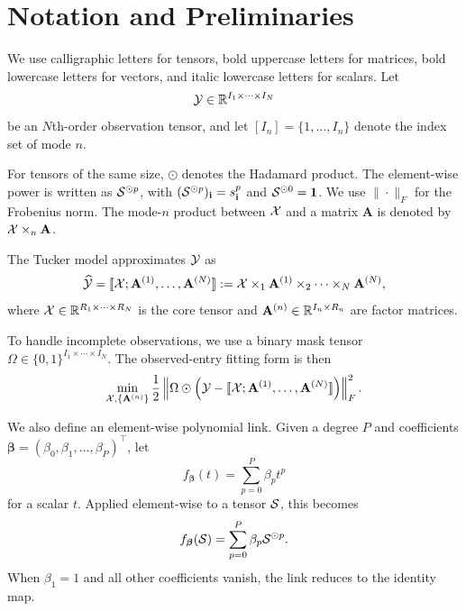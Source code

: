 \section{Notation and Preliminaries}
\label{sec:preliminaries}

We use calligraphic letters for tensors, bold uppercase letters for matrices, bold lowercase letters for vectors, and italic lowercase letters for scalars. Let
\[
\mathcal{Y}\in\mathbb{R}^{I_1\times\cdots\times I_N}
\]
be an $N$th-order observation tensor, and let $[I_n]=\{1,\dots,I_n\}$ denote the index set of mode $n$.

For tensors of the same size, $\odot$ denotes the Hadamard product. The element-wise power is written as $\mathcal{S}^{\odot p}$, with $(\mathcal{S}^{\odot p})_{\mathbf{i}}=s_{\mathbf{i}}^p$ and $\mathcal{S}^{\odot 0}=\mathbf{1}$. We use $\|\cdot\|_F$ for the Frobenius norm. The mode-$n$ product between $\mathcal{X}$ and a matrix $\mathbf{A}$ is denoted by $\mathcal{X}\times_n \mathbf{A}$.

The Tucker model approximates $\mathcal{Y}$ as
\[
\widehat{\mathcal{Y}}
=
\llbracket \mathcal{X};\mathbf{A}^{(1)},\dots,\mathbf{A}^{(N)} \rrbracket
:=
\mathcal{X}\times_1 \mathbf{A}^{(1)}\times_2\cdots\times_N \mathbf{A}^{(N)},
\]
where $\mathcal{X}\in\mathbb{R}^{R_1\times\cdots\times R_N}$ is the core tensor and $\mathbf{A}^{(n)}\in\mathbb{R}^{I_n\times R_n}$ are factor matrices.

To handle incomplete observations, we use a binary mask tensor $\Omega\in\{0,1\}^{I_1\times\cdots\times I_N}$. The observed-entry fitting form is then
\[
\min_{\mathcal{X},\{\mathbf{A}^{(n)}\}}
\frac12\left\|\Omega\odot\left(\mathcal{Y}-\llbracket \mathcal{X};\mathbf{A}^{(1)},\dots,\mathbf{A}^{(N)} \rrbracket\right)\right\|_F^2.
\]

We also define an element-wise polynomial link. Given a degree $P$ and coefficients $\boldsymbol{\beta}=(\beta_0,\beta_1,\dots,\beta_P)^\top$, let
\[
f_{\boldsymbol{\beta}}(t)=\sum_{p=0}^{P}\beta_p t^p
\]
for a scalar $t$. Applied element-wise to a tensor $\mathcal{S}$, this becomes
\[
f_{\boldsymbol{\beta}}(\mathcal{S})=\sum_{p=0}^{P}\beta_p\mathcal{S}^{\odot p}.
\]
When $\beta_1=1$ and all other coefficients vanish, the link reduces to the identity map.
